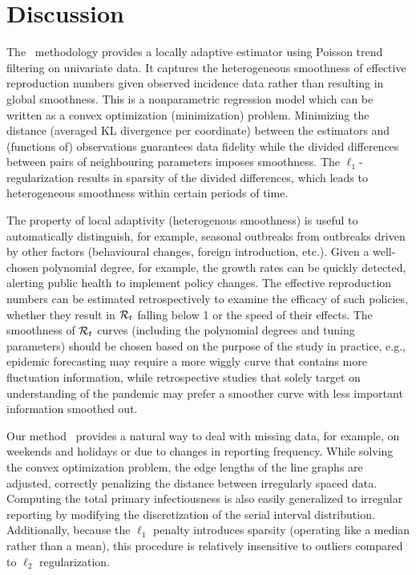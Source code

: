 \section{Discussion}

The \RtEstim\ methodology provides a locally adaptive estimator using Poisson
trend filtering on univariate data. It captures the heterogeneous smoothness of
effective reproduction numbers given observed incidence data rather than
resulting in global smoothness. This is a nonparametric regression model which
can be written as a convex optimization (minimization) problem. Minimizing the
distance (averaged KL divergence per coordinate) between the estimators and
(functions of) observations guarantees data fidelity while the  divided
differences between pairs of neighbouring parameters imposes smoothness. The
$\ell_1$-regularization results in sparsity of the divided differences, which
leads to heterogeneous smoothness within certain periods of time. 

The property of local adaptivity (heterogenous smoothness) is useful to
automatically distinguish, for example, seasonal outbreaks from outbreaks driven
by other factors (behavioural changes, foreign introduction, etc.). Given a
well-chosen polynomial degree, for example,
the growth rates can be quickly detected, alerting public health to implement
policy changes. The effective
reproduction numbers can be estimated retrospectively to examine the efficacy of
such policies, whether they result in $\mathcal{R}_t$ falling below 1 or the speed of
their effects. 
%
The smoothness of $\mathcal{R}_t$ curves (including the polynomial degrees and tuning parameters) 
should be chosen based on the purpose of the study in practice, e.g., epidemic 
forecasting may require a more wiggly curve that contains more fluctuation 
information, while retrospective studies that solely target on understanding of 
the pandemic may prefer a smoother curve with less important information smoothed out. 

Our method \RtEstim\ provides a natural way to deal with missing data, for
example, on weekends and holidays or due to changes in reporting frequency.
While solving the convex optimization problem, the edge lengths of the line
graphs are adjusted, correctly penalizing the distance between irregularly
spaced data. Computing the total
primary infectiousness is also easily generalized to irregular reporting by
modifying the discretization of the serial interval distribution. Additionally,
because the $\ell_1$ penalty introduces sparsity (operating like a median
rather than a mean), this procedure is relatively insensitive to outliers
compared to $\ell_2$ regularization.



